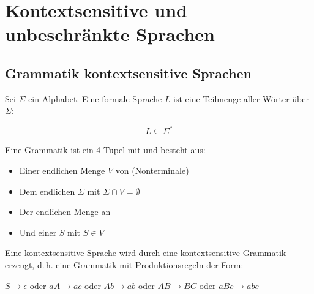 \documentclass{lehramt-informatik-haupt}
\begin{document}

\chapter{Kontextsensitive und unbeschränkte Sprachen}

\begin{liQuellen}
\item \cite[Seite 191-192]{hoffmann}
\end{liQuellen}

%

\section{Grammatik kontextsensitive Sprachen}

Sei $\Sigma$ ein Alphabet. Eine formale Sprache $L$ ist eine Teilmenge
aller Wörter über $\Sigma$:

\begin{displaymath}
L \subseteq \Sigma^*
\end{displaymath}

\bigskip

\noindent
Eine Grammatik ist ein 4-Tupel mit \liGrammatik{} und besteht aus:

\begin{itemize}
\item Einer endlichen Menge $V$ von  (Nonterminale)

\item Dem endlichen  $\Sigma$ mit $\Sigma \cap V
= \emptyset$

\item Der endlichen Menge an 

\item Und einer  $S$ mit $S \in V$
\end{itemize}

Eine kontextsensitive Sprache wird durch eine kontextsensitive
Grammatik erzeugt, d.\,h. eine Grammatik mit Produktionsregeln der
Form:

$S \rightarrow \epsilon$ oder
$aA \rightarrow ac$ oder
$Ab \rightarrow ab$ oder
$AB \rightarrow BC$ oder
$aBc \rightarrow abc$
\end{document}
